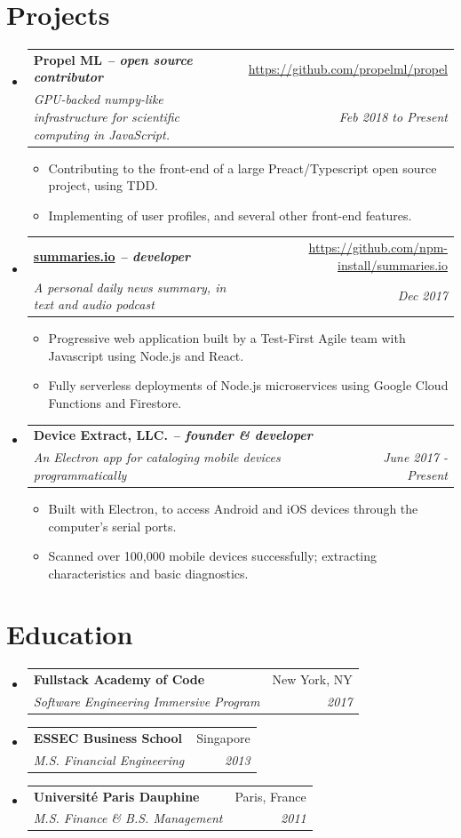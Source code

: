 \documentclass[letterpaper,10pt]{article}
\makeatletter
\newcommand{\resumeItemSimple}[1]{
    \item\small{
      {#1}{\vspace{-2pt}}
    }
  }
\newcommand{\resumeSubheading}[4]{
    \vspace{-1pt}\item
      \begin{tabular*}{0.97\textwidth}{l@{\extracolsep{\fill}}r}
        \textbf{#1} & #2 \\
        \textit{\small#3} & \textit{\small #4} \\
      \end{tabular*}\vspace{-5pt}
  }
\newcommand{\resumeSubHeadingListStart}{\begin{itemize}[leftmargin=*]}
\newcommand{\resumeSubHeadingListEnd}{\end{itemize}}
\newcommand{\resumeItemListStart}{\begin{itemize}}
\newcommand{\resumeItemListEnd}{\end{itemize}\vspace{-5pt}}
\makeatother
\begin{document}
  \section{Projects}
  \resumeSubHeadingListStart
    \resumeSubheading
      {Propel ML \normalfont\textit{-- open source contributor}}{\href{https://github.com/propelml/propel}{https://github.com/propelml/propel}}
      {GPU-backed numpy-like infrastructure for scientific computing in JavaScript.}{Feb 2018 to Present}
      \resumeItemListStart
        \resumeItemSimple{Contributing to the front-end of a large Preact/Typescript open source project, using TDD.}
        \resumeItemSimple{Implementing of user profiles, and several other front-end features.}
        \resumeItemListEnd


    \resumeSubheading
      {\href{https://summaries.io}{summaries.io} \normalfont\textit{-- developer}}{\href{https://github.com/npm-install/summaries.io}{https://github.com/npm-install/summaries.io}}
      {A personal daily news summary, in text and audio podcast}{Dec 2017}
      \resumeItemListStart
        \resumeItemSimple{Progressive web application built by a Test-First Agile team with Javascript using Node.js and React.}
        \resumeItemSimple{Fully serverless deployments of Node.js microservices using Google Cloud Functions and Firestore.}
        \resumeItemListEnd

    \resumeSubheading
      {Device Extract, LLC. \normalfont\textit{-- founder \& developer}}{}
      {An Electron app for cataloging mobile devices programmatically}{June 2017 - Present}
      \resumeItemListStart
        \resumeItemSimple{Built with Electron, to access Android and iOS devices through the computer's serial ports.}
        \resumeItemSimple{Scanned over 100,000 mobile devices successfully; extracting characteristics and basic diagnostics.}
        \resumeItemListEnd

        \resumeSubHeadingListEnd

  \section{Education}
  \resumeSubHeadingListStart
    \resumeSubheading
      {Fullstack Academy of Code}{New York, NY}
      {Software Engineering Immersive Program}{2017}
    \resumeSubheading
      {ESSEC Business School}{Singapore}
      {M.S. Financial Engineering}{2013}
    \resumeSubheading
      {Université Paris Dauphine}{Paris, France}
      {M.S. Finance \& B.S. Management}{2011}
  \resumeSubHeadingListEnd
  

  
\end{document}

